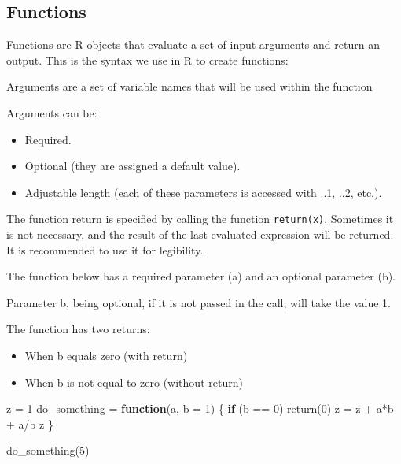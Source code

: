 \documentclass[
]{book}
\newenvironment{Shaded}{\begin{snugshade}}{\end{snugshade}}
\newcommand{\AttributeTok}[1]{\textcolor[rgb]{0.77,0.63,0.00}{#1}}
\newcommand{\ControlFlowTok}[1]{\textcolor[rgb]{0.13,0.29,0.53}{\textbf{#1}}}
\newcommand{\DecValTok}[1]{\textcolor[rgb]{0.00,0.00,0.81}{#1}}
\newcommand{\FunctionTok}[1]{\textcolor[rgb]{0.00,0.00,0.00}{#1}}
\newcommand{\NormalTok}[1]{#1}
\newcommand{\OtherTok}[1]{\textcolor[rgb]{0.56,0.35,0.01}{#1}}
\newcommand{\SpecialCharTok}[1]{\textcolor[rgb]{0.00,0.00,0.00}{#1}}
\providecommand{\tightlist}{%
  \setlength{\itemsep}{0pt}\setlength{\parskip}{0pt}}
\theoremstyle{definition}
\theoremstyle{definition}
\theoremstyle{definition}
\theoremstyle{definition}
\theoremstyle{remark}
\begin{document}
\hypertarget{functions}{%
\subsection{Functions}\label{functions}}

Functions are R objects that evaluate a set of input arguments and return an output. This is the syntax we use in R to create functions:

Arguments are a set of variable names that will be used within the function

Arguments can be:

\begin{itemize}
\tightlist
\item
  Required.
\item
  Optional (they are assigned a default value).
\item
  Adjustable length (each of these parameters is accessed with ..1, ..2, etc.).
\end{itemize}

The function return is specified by calling the function \texttt{return(x)}. Sometimes it is not necessary, and the result of the last evaluated expression will be returned. It is recommended to use it for legibility.

The function below has a required parameter (a) and an optional parameter (b).

Parameter b, being optional, if it is not passed in the call, will take the value 1.

The function has two returns:

\begin{itemize}
\tightlist
\item
  When b equals zero (with return)
\item
  When b is not equal to zero (without return)
\end{itemize}

\begin{Shaded}
\begin{Highlighting}[]
\NormalTok{z }\OtherTok{=} \DecValTok{1}
\NormalTok{do\_something }\OtherTok{=} \ControlFlowTok{function}\NormalTok{(a, }\AttributeTok{b =} \DecValTok{1}\NormalTok{) \{}
    \ControlFlowTok{if}\NormalTok{ (b }\SpecialCharTok{==} \DecValTok{0}\NormalTok{)}
        \FunctionTok{return}\NormalTok{(}\DecValTok{0}\NormalTok{)}
\NormalTok{    z }\OtherTok{=}\NormalTok{ z }\SpecialCharTok{+}\NormalTok{ a}\SpecialCharTok{*}\NormalTok{b }\SpecialCharTok{+}\NormalTok{ a}\SpecialCharTok{/}\NormalTok{b}
\NormalTok{    z}
\NormalTok{\}}

\FunctionTok{do\_something}\NormalTok{(}\DecValTok{5}\NormalTok{)}
\end{Highlighting}
\end{Shaded}
\end{document}
